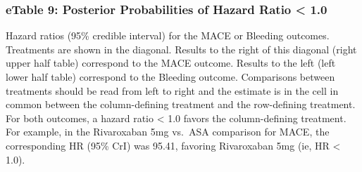 \documentclass[
  12pt,
]{article}
\begin{document}
\begin{landscape}
\newpage

\hypertarget{etable-9-posterior-probabilities-of-hazard-ratio-1.0}{%
\subsubsection{eTable 9: Posterior Probabilities of Hazard Ratio
\textless{}
1.0}\label{etable-9-posterior-probabilities-of-hazard-ratio-1.0}}

\begin{table}[!h]
\centering
{}
\end{table}

Hazard ratios (95\% credible interval) for the MACE or Bleeding
outcomes. Treatments are shown in the diagonal. Results to the right of
this diagonal (right upper half table) correspond to the MACE outcome.
Results to the left (left lower half table) correspond to the Bleeding
outcome. Comparisons between treatments should be read from left to
right and the estimate is in the cell in common between the
column-defining treatment and the row-defining treatment. For both
outcomes, a hazard ratio \textless{} 1.0 favors the column-defining
treatment. For example, in the Rivaroxaban 5mg vs.~ASA comparison for
MACE, the corresponding HR (95\% CrI) was 95.41, favoring Rivaroxaban
5mg (ie, HR \textless{} 1.0).

\newpage


\end{landscape}
\end{document}
